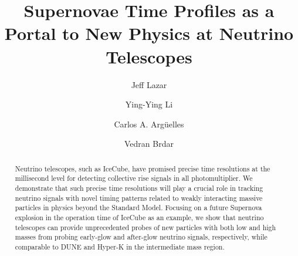 
\title{
Supernovae Time Profiles as a Portal to New Physics at Neutrino Telescopes
}

\author{Jeff Lazar}
\author{Ying-Ying Li}
\author{Carlos A. Arg\"{u}elles}
\author{Vedran Brdar}


\begin{abstract}
Neutrino telescopes, such as IceCube, have promised precise time resolutions at the millisecond level for detecting collective rise signals in all photomultiplier.
We demonstrate that such precise time resolutions will play a crucial role in tracking neutrino signals with novel timing patterns related to weakly interacting massive particles in physics beyond the Standard Model.
Focusing on a future Supernova explosion in the operation time of IceCube as an example, we show that neutrino telescopes can provide unprecedented probes of new particles with both low and high masses from probing early-glow and after-glow neutrino signals, respectively, while comparable to DUNE and Hyper-K in the intermediate mass region.
\end{abstract}

\maketitle